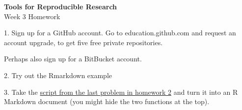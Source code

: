 \documentclass[12pt]{article}
\begin{document}
\thispagestyle{empty}

\textbf{Tools for Reproducible Research} \\
Week 3 Homework

\bigskip

1. Sign up for a GitHub account. Go to education.github.com and
request an account upgrade, to get five free private repositories.

Perhaps also sign up for a BitBucket account.

2. Try out the Rmarkdown example

3. Take the
\href{http://kbroman.org/Tools4RR/assets/homework/02_homework.R}{script from
  the last problem in homework 2}
and turn it into an R Markdown document (you might hide the two
functions at the top).
\end{document}
